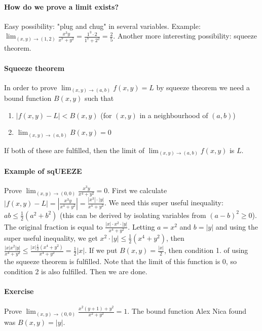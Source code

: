 \documentclass[10pt,letter]{article}
\theoremstyle{plain}
\theoremstyle{definition}
\begin{document}
\paragraph{How do we prove a limit exists?}
Easy possibility: "plug and chug" in several variables. Example: $\lim_{(x,y)\rightarrow(1,2)}\frac{x^3y}{x^7+y^2}=\frac{1^3\cdot2}{1^7+2^2}=\frac{2}{5}$. Another more interesting possibility: squeeze theorem. 

\paragraph{Squeeze theorem}
In order to prove $\lim_{(x,y)\rightarrow(a,b)}f(x,y)=L$ by squeeze theorem we need a bound function $B(x,y)$ such that \begin{enumerate}
    \item $|f(x,y)-L|<B(x,y)$ (for $(x,y)$ in a neighbourhood of $(a,b)$) 
    \item $\lim_{(x,y)\rightarrow(a,b)}B(x,y)=0$
\end{enumerate}
If both of these are fulfilled, then the limit of $\lim_{(x,y)\rightarrow(a,b)}f(x,y)$ is $L$. 


\paragraph{Example of sqUEEZE}
Prove $\lim_{(x,y)\rightarrow(0,0)}\frac{x^3y}{x^4+y^2}=0$. First we calculate $|f(x,y)-L|=\left|\frac{x^3y}{x^4+y^2}\right|=\frac{|x^3|\cdot|y|}{x^4+y^2}$. We need this super useful inequality: $ab\leq\frac{1}{2}(a^2+b^2)$ (this can be derived by isolating variables from $(a-b)^2\geq0$). The original fraction is equal to $\frac{|x|\cdot x^2\cdot|y|}{x^4+y^2}$. Letting $a=x^2$ and $b=|y|$ and using the super useful inequality, we get $x^2\cdot|y|\leq\frac{1}{2}(x^4+y^2)$, then $\frac{|x|x^2|y|}{x^4+y^2}\leq\frac{|x|\frac{1}{2}(x^4+y^2)}{x^4+y^2}=\frac{1}{2}|x|$. If we put $B(x,y)=\frac{|x|}{2}$, then condition 1. of using the squeeze theorem is fulfilled. Note that the limit of this function is $0$, so condition 2 is also fulfilled. Then we are done. 

\paragraph{Exercise}
Prove $\lim_{(x,y)\rightarrow(0,0)}\frac{x^2(y+1)+y^2}{x^2+y^2}=1$. The bound function Alex Nica found was $B(x,y)=|y|$. 
\end{document}
